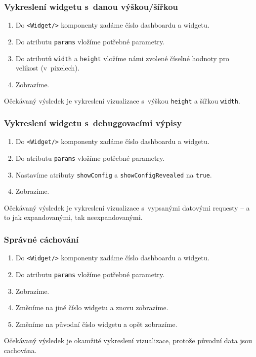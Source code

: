 \documentclass[czech, bc, kiv, he, iso690numb, viewonly]{fasthesis} %
\begin{document}
\subsubsection{Vykreslení widgetu s~danou výškou/šířkou}
\begin{enumerate}
	\item Do \texttt{<Widget/>} komponenty zadáme číslo dashboardu a widgetu.
	\item Do atributu \texttt{params} vložíme potřebné parametry.
	\item Do atributů \texttt{width} a \texttt{height} vložíme námi zvolené číselné hodnoty pro velikost (v~pixelech).
	\item Zobrazíme.
\end{enumerate}
Očekávaný výsledek je vykreslení vizualizace s~výškou \texttt{height} a šířkou \texttt{width}.

\subsubsection{Vykreslení widgetu s~debuggovacími výpisy}
\begin{enumerate}
	\item Do \texttt{<Widget/>} komponenty zadáme číslo dashboardu a widgetu.
	\item Do atributu \texttt{params} vložíme potřebné parametry.
	\item Nastavíme atributy \texttt{showConfig} a \texttt{showConfigRevealed} na \texttt{true}.
	\item Zobrazíme.
\end{enumerate}
Očekávaný výsledek je vykreslení vizualizace s~vypsanými datovými requesty – a to jak expandovanými, tak neexpandovanými.

\subsubsection{Správné cáchování}
\begin{enumerate}
	\item Do \texttt{<Widget/>} komponenty zadáme číslo dashboardu a widgetu.
	\item Do atributu \texttt{params} vložíme potřebné parametry.
	\item Zobrazíme.
	\item Změníme na jiné číslo widgetu a znovu zobrazíme.
	\item Změníme na původní číslo widgetu a opět zobrazíme.
\end{enumerate}
Očekávaný výsledek je okamžité vykreslení vizualizace, protože původní data jsou cachována.
\end{document}
